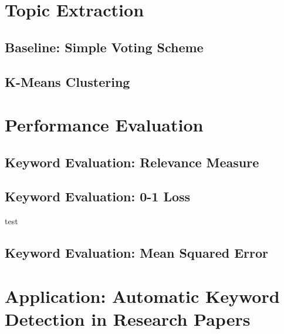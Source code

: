 \documentclass[12pt]{article}
\begin{document}
\section{Topic Extraction}
\subsection{Baseline: Simple Voting Scheme}
\subsection{K-Means Clustering}
\section{Performance Evaluation}
\subsection{Keyword Evaluation: Relevance Measure}
\subsection{Keyword Evaluation: 0-1 Loss}
test
\subsection{Keyword Evaluation: Mean Squared Error}
\section{Application: Automatic Keyword Detection in Research Papers}
\end{document}
